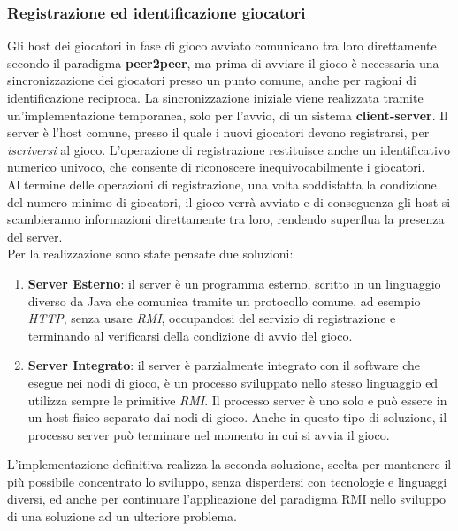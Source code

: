 \documentclass[10pt,a4paper]{article}
\begin{document}
\subsubsection{Registrazione ed identificazione giocatori}
Gli host dei giocatori in fase di gioco avviato comunicano tra loro direttamente secondo il paradigma \textbf{peer2peer}, ma prima di avviare il gioco è necessaria una sincronizzazione dei giocatori presso un punto comune, anche per ragioni di identificazione reciproca. La sincronizzazione iniziale viene realizzata tramite un'implementazione temporanea, solo per l'avvio, di un sistema \textbf{client-server}. Il server è l'host comune, presso il quale i nuovi giocatori devono registrarsi, per \textit{iscriversi} al gioco. L'operazione di registrazione restituisce anche un identificativo numerico univoco, che consente di riconoscere inequivocabilmente i giocatori. \\ Al termine delle operazioni di registrazione, una volta soddisfatta la condizione del numero minimo di giocatori, il gioco verrà avviato e di conseguenza gli host si scambieranno informazioni direttamente tra loro, rendendo superflua la presenza del server.\\ Per la realizzazione sono state pensate due soluzioni:
\begin{enumerate}
\item \textbf{Server Esterno}: il server è un programma esterno, scritto in un linguaggio diverso da Java che comunica tramite un protocollo comune, ad esempio \textit{HTTP}, senza usare \textit{RMI}, occupandosi del servizio di registrazione e terminando al verificarsi della condizione di avvio del gioco.

\item \textbf{Server Integrato}: il server è parzialmente integrato con il software che esegue nei nodi di gioco, è un processo sviluppato nello stesso linguaggio ed utilizza sempre le primitive \textit{RMI}. Il processo server è uno solo e può essere in un host fisico separato dai nodi di gioco. Anche in questo tipo di soluzione, il processo server può terminare nel momento in cui si avvia il gioco. 
\end{enumerate}
L'implementazione definitiva realizza la seconda soluzione, scelta per mantenere il più possibile concentrato lo sviluppo, senza disperdersi con tecnologie e linguaggi diversi, ed anche per continuare l'applicazione del paradigma RMI nello sviluppo di una soluzione ad un ulteriore problema.
\end{document}
